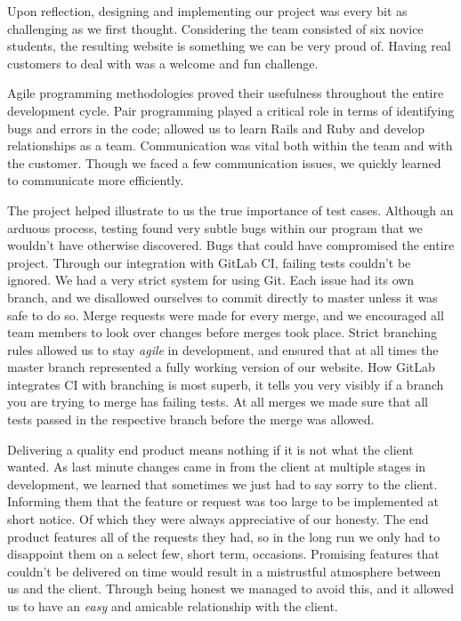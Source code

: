 \documentclass{l3proj}
\begin{document}
Upon reflection, designing and implementing our project was every bit as challenging as we first thought. Considering the team consisted of six novice students, the resulting website is something we can be very proud of. Having real customers to deal with was a welcome and fun challenge.

Agile programming methodologies proved their usefulness throughout the entire development cycle. Pair programming played a critical role in terms of identifying bugs and errors in the code; allowed us to learn Rails and Ruby and develop relationships as a team. Communication was vital both within the team and with the customer. Though we faced a few communication issues, we quickly learned to communicate more efficiently.


The project helped illustrate to us the true importance of test cases. Although an arduous process, testing found very subtle bugs within our program that we wouldn't have otherwise discovered. Bugs that could have compromised the entire project. Through our integration with GitLab CI, failing tests couldn't be ignored. We had a very strict system for using Git. Each issue had its own branch, and we disallowed ourselves to commit directly to master unless it was safe to do so. Merge requests were made for every merge, and we encouraged all team members to look over changes before merges took place. Strict branching rules allowed us to stay \textit{agile} in development, and ensured that at all times the master branch represented a fully working version of our website. How GitLab integrates CI with branching is most superb, it tells you very visibly if a branch you are trying to merge has failing tests. At all merges we made sure that all tests passed in the respective branch before the merge was allowed.

Delivering a quality end product means nothing if it is not what the client wanted. As last minute changes came in from the client at multiple stages in development, we learned that sometimes we just had to say sorry to the client. Informing them that the feature or request was too large to be implemented at short notice. Of which they were always appreciative of our honesty. The end product features all of the requests they had, so in the long run we only had to disappoint them on a select few, short term, occasions. Promising features that couldn't be delivered on time would result in a mistrustful atmosphere between us and the client. Through being honest we managed to avoid this, and it allowed us to have an \textit{easy} and amicable relationship with the client.
\end{document}
